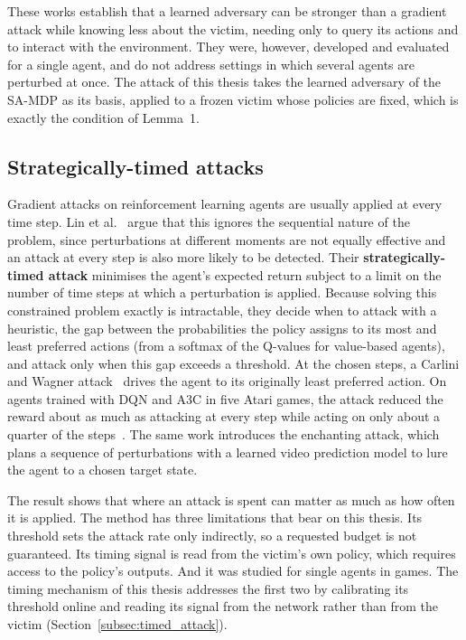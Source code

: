 These works establish that a learned adversary can be stronger than a gradient attack
while knowing less about the victim, needing only to query its actions and to interact
with the environment. They were, however, developed and evaluated for a single agent,
and do not address settings in which several agents are perturbed at once. The attack of
this thesis takes the learned adversary of the SA-MDP as its basis, applied to a frozen
victim whose policies are fixed, which is exactly the condition of Lemma~1.

\subsection{Strategically-timed attacks}
\label{subsec:lit_timed_attacks}

Gradient attacks on reinforcement learning agents are usually applied at every time
step. Lin et al.~\cite{lin2019tacticsadversarialattackdeep} argue that this ignores the
sequential nature of the problem, since perturbations at different moments are not
equally effective and an attack at every step is also more likely to be detected. Their
\textbf{strategically-timed attack} minimises the agent's expected return subject to a
limit on the number of time steps at which a perturbation is applied. Because solving
this constrained problem exactly is intractable, they decide when to attack with a
heuristic, the gap between the probabilities the policy assigns to its most and least
preferred actions (from a softmax of the Q-values for value-based agents), and attack
only when this gap exceeds a threshold. At the chosen steps, a Carlini and Wagner
attack~\cite{carlini2017evaluatingrobustnessneuralnetworks} drives the agent to its
originally least preferred action. On agents trained with DQN and A3C in five Atari
games, the attack reduced the reward about as much as attacking at every step while
acting on only about a quarter of the steps~\cite{lin2019tacticsadversarialattackdeep}.
The same work introduces the enchanting attack, which plans a sequence of perturbations
with a learned video prediction model to lure the agent to a chosen target state.

The result shows that where an attack is spent can matter as much as how often it is
applied. The method has three limitations that bear on this thesis. Its threshold sets
the attack rate only indirectly, so a requested budget is not guaranteed. Its timing
signal is read from the victim's own policy, which requires access to the policy's
outputs. And it was studied for single agents in games. The timing mechanism of this
thesis addresses the first two by calibrating its threshold online and reading its
signal from the network rather than from the victim (Section~\ref{subsec:timed_attack}).

